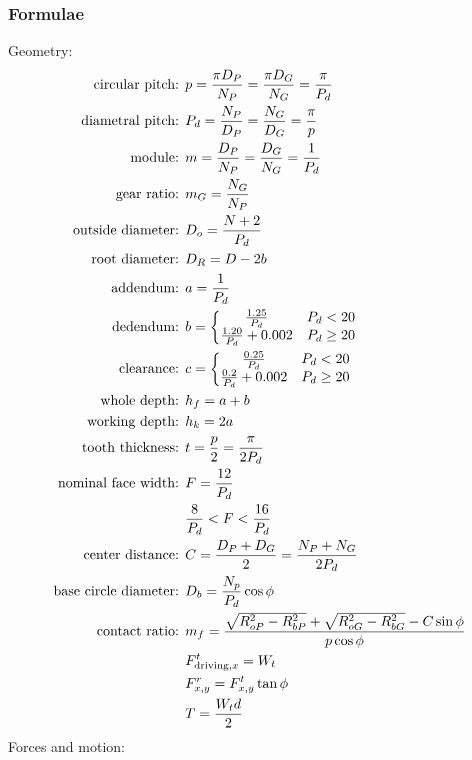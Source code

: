 \documentclass[11pt, fleqn]{article}
\begin{document}
\subsubsection{Formulae}
Geometry:
\begin{align*}
    \text{circular pitch: }&p=\frac{\pi D_P}{N_P}=\frac{\pi D_G}{N_G}=\frac{\pi}{P_d}\\
    \text{diametral pitch: }&P_d=\frac{N_P}{D_P}=\frac{N_G}{D_G}=\frac{\pi}{p}\\
    \text{module: }&m=\frac{D_P}{N_P}=\frac{D_G}{N_G}=\frac{1}{P_d}\\
    \text{gear ratio: }&m_G=\frac{N_G}{N_P}\\
    \text{outside diameter: }&D_o=\frac{N+2}{P_d}\\
    \text{root diameter: }&D_R=D-2b\\
    \text{addendum: }&a=\frac{1}{P_d}\\
    \text{dedendum: }&b=\left\{\begin{matrix} \frac{1.25}{P_d} & P_d<20\\ \frac{1.20}{P_d}+0.002 & P_d\geq 20 \end{matrix}\right.\\
    \text{clearance: }&c=\left\{\begin{matrix} \frac{0.25}{P_d} & P_d<20\\ \frac{0.2}{P_d}+0.002 & P_d\geq 20 \end{matrix}\right.\\
    \text{whole depth: }&h_f=a+b\\
    \text{working depth: }&h_k=2a\\
    \text{tooth thickness: }&t=\frac{p}{2}=\frac{\pi}{2P_d}\\
    \text{nominal face width: }&F=\frac{12}{P_d}\\
    &\frac{8}{P_d}<F<\frac{16}{P_d}\\
    \text{center distance: }&C=\frac{D_P+D_G}{2}=\frac{N_P+N_G}{2P_d}\\
    \text{base circle diameter: }&D_b=\frac{N_p}{P_d}\cos\phi\\
    \text{contact ratio: }&m_f=\frac{\sqrt{R_{oP}^2-R_{bP}^2}+\sqrt{R_{oG}^2-R_{bG}^2}-C\sin\phi}{p\cos\phi}\\
    &F_{\text{driving},x}^t=W_t\\
    &F_{x,y}^r=F_{x,y}^t\tan\phi\\
    &T=\frac{W_td}{2}
\end{align*}
Forces and motion:
\end{document}
